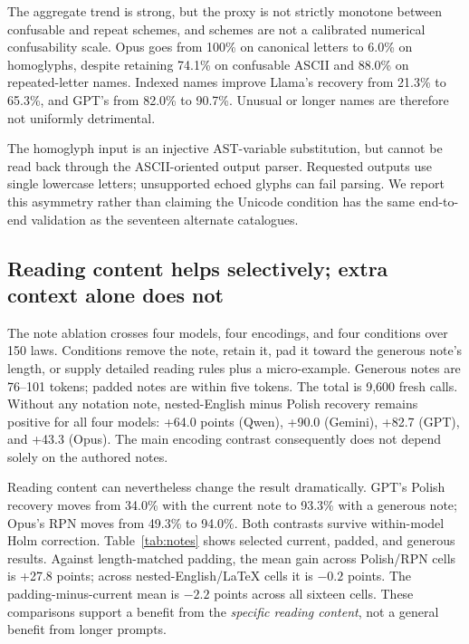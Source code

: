\documentclass{article}
\newcommand{\pct}{\%}
\begin{document}
The aggregate trend is strong, but the proxy is not strictly monotone between
confusable and repeat schemes, and schemes are not a calibrated numerical
confusability scale. Opus goes from 100\pct{} on canonical letters to
6.0\pct{} on homoglyphs, despite retaining 74.1\pct{} on confusable ASCII and
88.0\pct{} on repeated-letter names. Indexed names improve Llama's recovery
from 21.3\pct{} to 65.3\pct{}, and GPT's from 82.0\pct{} to 90.7\pct{}.
Unusual or longer names are therefore not uniformly detrimental.

The homoglyph input is an injective AST-variable substitution, but cannot be
read back through the ASCII-oriented output parser. Requested outputs use
single lowercase letters; unsupported echoed glyphs can fail parsing. We report
this asymmetry rather than claiming the Unicode condition has the same
end-to-end validation as the seventeen alternate catalogues.

\subsection{Reading content helps selectively; extra context alone does not}

The note ablation crosses four models, four encodings, and four conditions over
150 laws. Conditions remove the note, retain it, pad it toward the generous
note's length, or supply detailed reading rules plus a micro-example. Generous
notes are 76--101 tokens; padded notes are within five tokens. The total is
9,600 fresh calls. Without any notation note, nested-English minus Polish
recovery remains positive for all four models: +64.0 points (Qwen), +90.0
(Gemini), +82.7 (GPT), and +43.3 (Opus). The main encoding contrast consequently
does not depend solely on the authored notes.

Reading content can nevertheless change the result dramatically. GPT's Polish
recovery moves from 34.0\pct{} with the current note to 93.3\pct{} with a
generous note; Opus's RPN moves from 49.3\pct{} to 94.0\pct{}. Both contrasts
survive within-model Holm correction. Table~\ref{tab:notes} shows selected
current, padded, and generous results. Against length-matched padding, the mean
gain across Polish/RPN cells is +27.8 points; across nested-English/LaTeX cells
it is $-0.2$ points. The padding-minus-current mean is $-2.2$ points across all
sixteen cells. These comparisons support a benefit from the \emph{specific
reading content}, not a general benefit from longer prompts.
\end{document}
